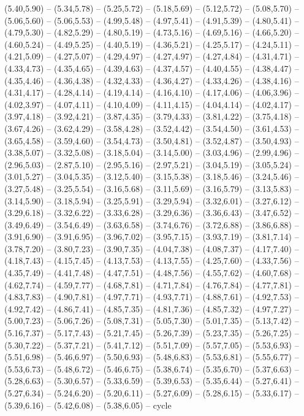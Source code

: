 \expandafter\def\csname geo:gebiet:DE-HE\endcsname{
  (5.40,5.90) -- (5.34,5.78) -- (5.25,5.72) -- (5.18,5.69) -- (5.12,5.72) -- (5.08,5.70) -- (5.06,5.60) -- (5.06,5.53) -- (4.99,5.48) -- (4.97,5.41) -- (4.91,5.39) -- (4.80,5.41) -- (4.79,5.30) -- (4.82,5.29) -- (4.80,5.19) -- (4.73,5.16) -- (4.69,5.16) -- (4.66,5.20) -- (4.60,5.24) -- (4.49,5.25) -- (4.40,5.19) -- (4.36,5.21) -- (4.25,5.17) -- (4.24,5.11) -- (4.21,5.09) -- (4.27,5.07) -- (4.29,4.97) -- (4.27,4.97) -- (4.27,4.84) -- (4.31,4.71) -- (4.33,4.73) -- (4.35,4.65) -- (4.39,4.63) -- (4.37,4.57) -- (4.40,4.55) -- (4.38,4.47) -- (4.35,4.46) -- (4.36,4.38) -- (4.32,4.33) -- (4.36,4.27) -- (4.33,4.26) -- (4.38,4.16) -- (4.31,4.17) -- (4.28,4.14) -- (4.19,4.14) -- (4.16,4.10) -- (4.17,4.06) -- (4.06,3.96) -- (4.02,3.97) -- (4.07,4.11) -- (4.10,4.09) -- (4.11,4.15) -- (4.04,4.14) -- (4.02,4.17) -- (3.97,4.18) -- (3.92,4.21) -- (3.87,4.35) -- (3.79,4.33) -- (3.81,4.22) -- (3.75,4.18) -- (3.67,4.26) -- (3.62,4.29) -- (3.58,4.28) -- (3.52,4.42) -- (3.54,4.50) -- (3.61,4.53) -- (3.65,4.58) -- (3.59,4.60) -- (3.54,4.73) -- (3.50,4.81) -- (3.52,4.87) -- (3.50,4.93) -- (3.38,5.07) -- (3.32,5.08) -- (3.18,5.04) -- (3.14,5.00) -- (3.03,4.96) -- (2.99,4.96) -- (2.96,5.03) -- (2.87,5.10) -- (2.95,5.16) -- (2.97,5.21) -- (3.04,5.19) -- (3.05,5.24) -- (3.01,5.27) -- (3.04,5.35) -- (3.12,5.40) -- (3.15,5.38) -- (3.18,5.46) -- (3.24,5.46) -- (3.27,5.48) -- (3.25,5.54) -- (3.16,5.68) -- (3.11,5.69) -- (3.16,5.79) -- (3.13,5.83) -- (3.14,5.90) -- (3.18,5.94) -- (3.25,5.91) -- (3.29,5.94) -- (3.32,6.01) -- (3.27,6.12) -- (3.29,6.18) -- (3.32,6.22) -- (3.33,6.28) -- (3.29,6.36) -- (3.36,6.43) -- (3.47,6.52) -- (3.49,6.49) -- (3.54,6.49) -- (3.63,6.58) -- (3.74,6.76) -- (3.72,6.88) -- (3.86,6.88) -- (3.91,6.90) -- (3.91,6.95) -- (3.96,7.02) -- (3.95,7.15) -- (3.93,7.19) -- (3.81,7.14) -- (3.78,7.20) -- (3.80,7.23) -- (3.90,7.35) -- (4.04,7.38) -- (4.08,7.37) -- (4.17,7.40) -- (4.18,7.43) -- (4.15,7.45) -- (4.13,7.53) -- (4.13,7.55) -- (4.25,7.60) -- (4.33,7.56) -- (4.35,7.49) -- (4.41,7.48) -- (4.47,7.51) -- (4.48,7.56) -- (4.55,7.62) -- (4.60,7.68) -- (4.62,7.74) -- (4.59,7.77) -- (4.68,7.81) -- (4.71,7.84) -- (4.76,7.84) -- (4.77,7.81) -- (4.83,7.83) -- (4.90,7.81) -- (4.97,7.71) -- (4.93,7.71) -- (4.88,7.61) -- (4.92,7.53) -- (4.92,7.42) -- (4.86,7.41) -- (4.85,7.35) -- (4.81,7.36) -- (4.85,7.32) -- (4.97,7.27) -- (5.00,7.23) -- (5.06,7.26) -- (5.08,7.31) -- (5.05,7.30) -- (5.01,7.35) -- (5.13,7.42) -- (5.16,7.37) -- (5.17,7.43) -- (5.21,7.45) -- (5.26,7.39) -- (5.23,7.35) -- (5.26,7.25) -- (5.30,7.22) -- (5.37,7.21) -- (5.41,7.12) -- (5.51,7.09) -- (5.57,7.05) -- (5.53,6.93) -- (5.51,6.98) -- (5.46,6.97) -- (5.50,6.93) -- (5.48,6.83) -- (5.53,6.81) -- (5.55,6.77) -- (5.53,6.73) -- (5.48,6.72) -- (5.46,6.75) -- (5.38,6.74) -- (5.35,6.70) -- (5.37,6.63) -- (5.28,6.63) -- (5.30,6.57) -- (5.33,6.59) -- (5.39,6.53) -- (5.35,6.44) -- (5.27,6.41) -- (5.27,6.34) -- (5.24,6.20) -- (5.20,6.11) -- (5.27,6.09) -- (5.28,6.15) -- (5.33,6.17) -- (5.39,6.16) -- (5.42,6.08) -- (5.38,6.05) -- cycle}
